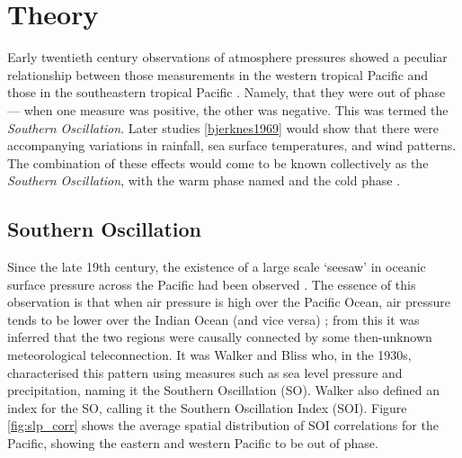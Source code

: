 \section{Theory}
\label{sec:theory}

Early twentieth century observations of atmosphere pressures showed a peculiar
relationship between those measurements in the western tropical Pacific and
those in the southeastern tropical Pacific \citep{holton1989}. Namely, that they
were out of phase --- when one measure was positive, the other was negative.
This was termed the \emph{Southern Oscillation}. Later studies
\ref{bjerknes1969} would show that there were accompanying variations in
rainfall, sea surface temperatures, and wind patterns. The combination of these
effects would come to be known collectively as the \elnino{} \emph{Southern
  Oscillation}, with the warm phase named \elnino{} and the cold phase \nina{}.


\subsection{Southern Oscillation}
Since the late 19th century, the existence of a large scale `seesaw' in oceanic
surface pressure across the Pacific had been observed \citep{trenberth2000}. The
essence of this observation is that when air pressure is high over the Pacific
Ocean, air pressure tends to be lower over the Indian Ocean (and vice versa)
\citep{philander1990}; from this it was inferred that the two regions were
causally connected by some then-unknown meteorological teleconnection. It was
Walker and Bliss who, in the 1930s, characterised this pattern using measures
such as sea level pressure and precipitation, naming it the Southern Oscillation
(SO). Walker also defined an index for the SO, calling it the Southern
Oscillation Index (SOI). Figure \ref{fig:slp_corr} shows the average spatial
distribution of SOI correlations for the Pacific, showing the eastern and
western Pacific to be out of phase.


